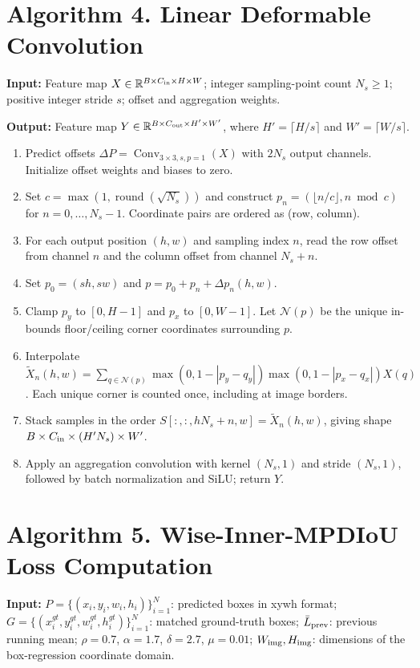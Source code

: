 \documentclass[10pt]{article}
\begin{document}
\section*{Algorithm 4. Linear Deformable Convolution}
\textbf{Input:} Feature map $X\in\mathbb R^{B\times C_{\rm in}\times H\times W}$; integer sampling-point count $N_s\ge1$; positive integer stride $s$; offset and aggregation weights.

\textbf{Output:} Feature map $Y\in\mathbb R^{B\times C_{\rm out}\times H'\times W'}$, where $H'=\lceil H/s\rceil$ and $W'=\lceil W/s\rceil$.

\begin{enumerate}[label=\arabic*:,leftmargin=2em,itemsep=3pt]
\item Predict offsets $\Delta P=\operatorname{Conv}_{3\times3,s,p=1}(X)$ with $2N_s$ output channels. Initialize offset weights and biases to zero.
\item Set $c=\max(1,\operatorname{round}(\sqrt{N_s}))$ and construct $p_n=(\lfloor n/c\rfloor,n\bmod c)$ for $n=0,\ldots,N_s-1$. Coordinate pairs are ordered as (row, column).
\item For each output position $(h,w)$ and sampling index $n$, read the row offset from channel $n$ and the column offset from channel $N_s+n$.
\item Set $p_0=(sh,sw)$ and $p=p_0+p_n+\Delta p_n(h,w)$.
\item Clamp $p_y$ to $[0,H-1]$ and $p_x$ to $[0,W-1]$. Let $\mathcal N(p)$ be the unique in-bounds floor/ceiling corner coordinates surrounding $p$.
\item Interpolate $\widetilde X_n(h,w)=\sum_{q\in\mathcal N(p)}\max(0,1-|p_y-q_y|)\max(0,1-|p_x-q_x|)X(q)$. Each unique corner is counted once, including at image borders.
\item Stack samples in the order $S[:, :,hN_s+n,w]=\widetilde X_n(h,w)$, giving shape $B\times C_{\rm in}\times(H'N_s)\times W'$.
\item Apply an aggregation convolution with kernel $(N_s,1)$ and stride $(N_s,1)$, followed by batch normalization and SiLU; return $Y$.
\end{enumerate}
\section*{Algorithm 5. Wise-Inner-MPDIoU Loss Computation}
\textbf{Input:} $P=\{(x_i,y_i,w_i,h_i)\}_{i=1}^N$: predicted boxes in xywh format; $G=\{(x_i^{gt},y_i^{gt},w_i^{gt},h_i^{gt})\}_{i=1}^N$: matched ground-truth boxes; $\bar L_{\rm prev}$: previous running mean; $\rho=0.7$, $\alpha=1.7$, $\delta=2.7$, $\mu=0.01$; $W_{\rm img},H_{\rm img}$: dimensions of the box-regression coordinate domain.
\end{document}

